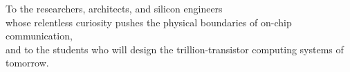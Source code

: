 
\begin{dedication}
To the researchers, architects, and silicon engineers\\
whose relentless curiosity pushes the physical boundaries of on-chip communication,\\
and to the students who will design the trillion-transistor computing systems of tomorrow.
\end{dedication}
